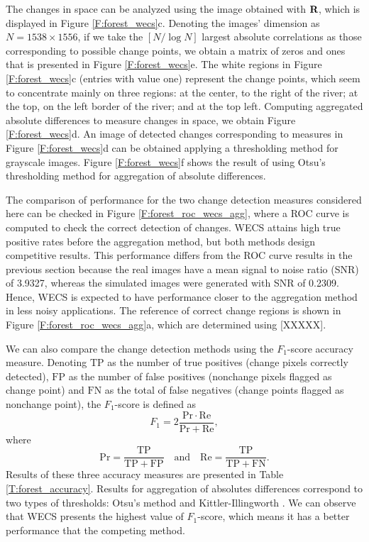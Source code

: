 \documentclass[journal]{IEEEtran}
\newcommand{\vR}{{\textbf R}}
\begin{document}
The changes in space can be analyzed using the image obtained with $\vR$, which is displayed in Figure \ref{F:forest_wecs}c. Denoting the images' dimension as $N=1538\times1556$, if we take the $[N/\log N]$ largest absolute correlations as those corresponding to possible change points, we obtain a matrix of zeros and ones that is presented in Figure \ref{F:forest_wecs}e. The white regions in Figure \ref{F:forest_wecs}c (entries with value one) represent the change points, which seem to concentrate mainly on three regions: at the center, to the right of the river; at the top, on the left border of the river; and at the top left. Computing aggregated absolute differences to measure changes in space, we obtain Figure \ref{F:forest_wecs}d. An image of detected changes corresponding to measures in  Figure \ref{F:forest_wecs}d can be obtained applying a thresholding method for grayscale images.  Figure \ref{F:forest_wecs}f shows the result of using Otsu's thresholding method \cite{otsu1979threshold} for aggregation of absolute differences.

The comparison of performance for the two change detection measures considered here can be checked in Figure \ref{F:forest_roc_wecs_agg}, where a ROC curve is computed to check the correct detection of changes. WECS attains high true positive rates before the aggregation method, but both methods design competitive results. This performance differs from the ROC curve results in the previous section because the real images have a mean signal to noise ratio (SNR) of 3.9327, whereas the simulated images were generated with SNR of 0.2309. Hence, WECS is expected to have performance closer to the aggregation method in less noisy applications. The reference of correct change regions is shown in Figure \ref{F:forest_roc_wecs_agg}a, which are determined using [XXXXX]. 

We can also compare the change detection methods using the $F_1$-score accuracy measure. Denoting $\mathrm{TP}$ as the number of true positives (change pixels correctly detected), $\mathrm{FP}$ as the number of false positives (nonchange pixels flagged as change point) and $\mathrm{FN}$ as the total of false negatives (change points flagged as nonchange point), the $F_1$-score is defined as
\begin{equation*}
F_1 = 2\frac{\mathrm{Pr}\cdot\mathrm{Re}}{\mathrm{Pr}+\mathrm{Re}}	,
\end{equation*}
where
\begin{equation*}
\mathrm{Pr}=\frac{\mathrm{TP}}{\mathrm{TP}+\mathrm{FP}}\quad 
\text{and} \quad \mathrm{Re} = \frac{\mathrm{TP}}{\mathrm{TP}+\mathrm{FN}}.
\end{equation*}
Results of these three accuracy measures are presented in Table \ref{T:forest_accuracy}. Results for aggregation of absolutes differences correspond to two types of thresholds: Otsu's method and Kittler-Illingworth \cite{kittler1986minimum}. We can observe that WECS presents the highest value of $F_1$-score, which means it has a better performance that the competing method.
\end{document}
